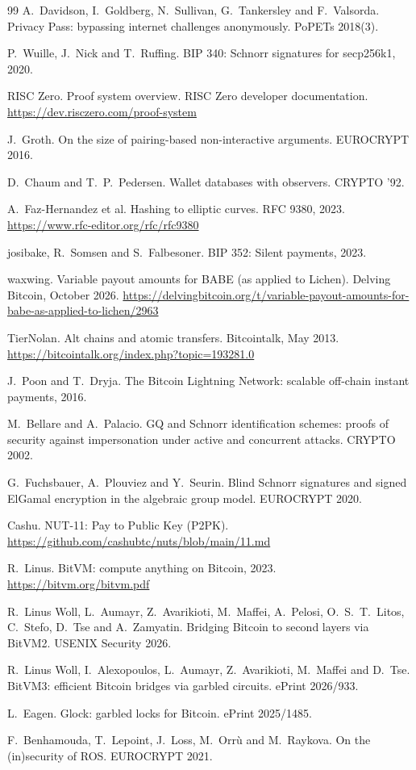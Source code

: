 \documentclass[11pt]{article}
\begin{document}
\begin{thebibliography}{99}
 A.~Davidson, I.~Goldberg, N.~Sullivan, G.~Tankersley and F.~Valsorda. Privacy Pass: bypassing internet challenges anonymously. PoPETs 2018(3).

 P.~Wuille, J.~Nick and T.~Ruffing. BIP 340: Schnorr signatures for secp256k1, 2020.

 RISC Zero. Proof system overview. RISC Zero developer documentation. \url{https://dev.risczero.com/proof-system}

 J.~Groth. On the size of pairing-based non-interactive arguments. EUROCRYPT 2016.

 D.~Chaum and T.~P.~Pedersen. Wallet databases with observers. CRYPTO '92.

 A.~Faz-Hernandez et al. Hashing to elliptic curves. RFC 9380, 2023. \url{https://www.rfc-editor.org/rfc/rfc9380}

 josibake, R.~Somsen and S.~Falbesoner. BIP 352: Silent payments, 2023.

 waxwing. Variable payout amounts for BABE (as applied to Lichen). Delving Bitcoin, October 2026. \url{https://delvingbitcoin.org/t/variable-payout-amounts-for-babe-as-applied-to-lichen/2963}

 TierNolan. Alt chains and atomic transfers. Bitcointalk, May 2013. \url{https://bitcointalk.org/index.php?topic=193281.0}

 J.~Poon and T.~Dryja. The Bitcoin Lightning Network: scalable off-chain instant payments, 2016.

 M.~Bellare and A.~Palacio. GQ and Schnorr identification schemes: proofs of security against impersonation under active and concurrent attacks. CRYPTO 2002.

 G.~Fuchsbauer, A.~Plouviez and Y.~Seurin. Blind Schnorr signatures and signed ElGamal encryption in the algebraic group model. EUROCRYPT 2020.

 Cashu. NUT-11: Pay to Public Key (P2PK). \url{https://github.com/cashubtc/nuts/blob/main/11.md}

 R.~Linus. BitVM: compute anything on Bitcoin, 2023. \url{https://bitvm.org/bitvm.pdf}

 R.~Linus Woll, L.~Aumayr, Z.~Avarikioti, M.~Maffei, A.~Pelosi, O.~S.~T.~Litos, C.~Stefo, D.~Tse and A.~Zamyatin. Bridging Bitcoin to second layers via BitVM2. USENIX Security 2026.

 R.~Linus Woll, I.~Alexopoulos, L.~Aumayr, Z.~Avarikioti, M.~Maffei and D.~Tse. BitVM3: efficient Bitcoin bridges via garbled circuits. ePrint 2026/933.

 L.~Eagen. Glock: garbled locks for Bitcoin. ePrint 2025/1485.

 F.~Benhamouda, T.~Lepoint, J.~Loss, M.~Orr\`u and M.~Raykova. On the (in)security of ROS. EUROCRYPT 2021.

\end{thebibliography}
\end{document}
